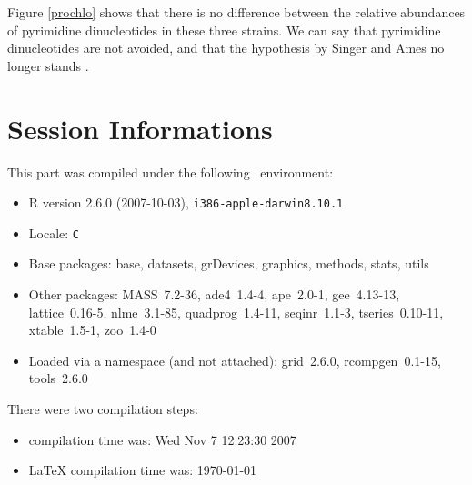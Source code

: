 \documentclass{article}
\begin{document}
Figure \ref{prochlo} shows that there is no difference between the
relative abundances of pyrimidine dinucleotides in these three
strains. We can say that pyrimidine dinucleotides are not avoided, and
that the hypothesis by Singer and Ames \cite{Singer} no longer stands
\cite{UV}.


\section*{Session Informations}

This part was compiled under the following \Rlogo{}~environment:

\begin{itemize}
  \item R version 2.6.0 (2007-10-03), \verb|i386-apple-darwin8.10.1|
  \item Locale: \verb|C|
  \item Base packages: base, datasets, grDevices, graphics, methods,
    stats, utils
  \item Other packages: MASS~7.2-36, ade4~1.4-4, ape~2.0-1,
    gee~4.13-13, lattice~0.16-5, nlme~3.1-85, quadprog~1.4-11,
    seqinr~1.1-3, tseries~0.10-11, xtable~1.5-1, zoo~1.4-0
  \item Loaded via a namespace (and not attached): grid~2.6.0,
    rcompgen~0.1-15, tools~2.6.0
\end{itemize}
There were two compilation steps:

\begin{itemize}
  \item \Rlogo{} compilation time was: Wed Nov  7 12:23:30 2007
  \item \LaTeX{} compilation time was: \today
\end{itemize}



\clearpage
{}


\end{document}
